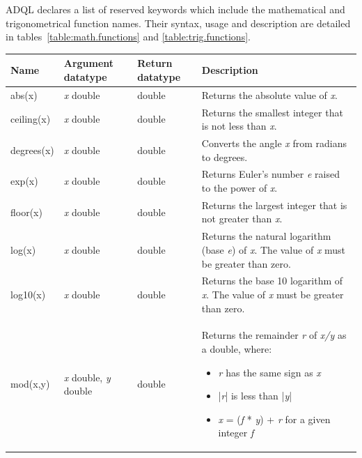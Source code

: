\documentclass[11pt,a4paper]{ivoa}
\begin{document}
ADQL declares a list of reserved keywords  which include
the mathematical and trigonometrical function names. Their syntax,
usage and description are detailed in tables~\ref{table:math.functions}
and \ref{table:trig.functions}.

\begin{table}[tpb]\footnotesize
    \begin{tabular}{|p{}|p{}|p{}|p{}|}

        \hline
        \textbf{Name} &
        \textbf{Argument \newline datatype} &
        \textbf{Return \newline datatype} &
        \textbf{Description}
        \tabularnewline

        \hline
        abs(x) &
        \textit{x} double &
        double &
        Returns the absolute value of \textit{x}.
        \tabularnewline

        \hline
        ceiling(x) &
        \textit{x} double &
        double &
        Returns the smallest integer that is not less than \textit{x}.
        \tabularnewline

        \hline
        degrees(x) &
        \textit{x} double &
        double &
        Converts the angle \textit{x} from radians to degrees.
        \tabularnewline

        \hline
        exp(x) &
        \textit{x} double &
        double &
        Returns Euler’s number \textit{e} raised to the power of \textit{x}.
        \tabularnewline

        \hline
        floor(x) &
        \textit{x} double &
        double &
        Returns the largest integer that is not greater than \textit{x}.
        \tabularnewline

        \hline
        log(x) &
        \textit{x} double &
        double &
        Returns the natural logarithm (base \textit{e}) of \textit{x}. The value of \textit{x} must be greater than zero.
        \tabularnewline

        \hline
        log10(x) &
        \textit{x} double &
        double &
        Returns the base 10 logarithm of \textit{x}. The value of \textit{x} must be greater than zero.
        \tabularnewline

        \hline
        mod(x,y) &
        \textit{x} double,
        \newline
        \textit{y} double &
        double &
        Returns the remainder \textit{r} of \textit{x/y} as a double,
        where:
        \begin{itemize}
            \item \textit{r} has the same sign as \textit{x}
            \item |\textit{r}| is less than |\textit{y}|
            \item \textit{x} = (\textit{f} * \textit{y}) + \textit{r} for a given integer \textit{f}
        \end{itemize}
        \tabularnewline


\end{tabular}
\end{table}
\end{document}
